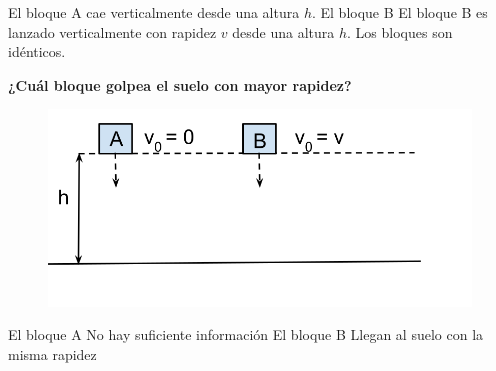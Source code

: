 El bloque A cae verticalmente desde una altura $h$. El bloque B
El bloque B es lanzado verticalmente con rapidez $v$ desde una
altura $h$. Los bloques son idénticos.

\textbf{¿Cuál bloque golpea el suelo con mayor rapidez?}

\begin{minipage}{0.3\textwidth}
    \begin{figure}[H]
        \includegraphics[width=\linewidth]{../images/ebe143038a306d8fc97291afae908ba3bf3bfd44}
    \end{figure}
\end{minipage}\hfill
\begin{minipage}{0.65\textwidth}
    \begin{choices}
        \choice El bloque A
        \choice No hay suficiente información
        \CorrectChoice El bloque B
        \choice Llegan al suelo con la misma rapidez
    \end{choices}
\end{minipage}